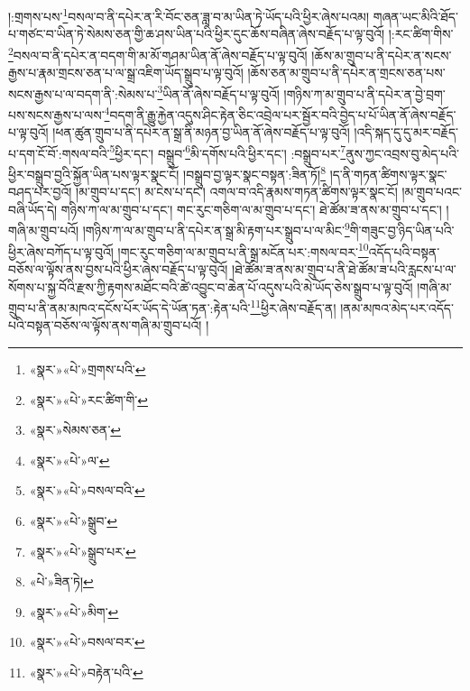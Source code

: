 །:གྲགས་པས་\footnote{«སྣར་»«པེ་»གྲགས་པའི་}བསལ་བ་ནི་དཔེར་ན་རི་བོང་ཅན་ཟླ་བ་མ་ཡིན་ཏེ་ཡོད་པའི་ཕྱིར་ཞེས་པའམ། གཞན་ཡང་མིའི་ཐོད་པ་གཙང་བ་ཡིན་ཏེ་སེམས་ཅན་གྱི་ཆ་ཤས་ཡིན་པའི་ཕྱིར་དུང་ཆོས་བཞིན་ཞེས་བརྗོད་པ་ལྟ་བུའོ། །:རང་ཚིག་གིས་\footnote{«སྣར་»«པེ་»རང་ཚིག་གི་}བསལ་བ་ནི་དཔེར་ན་བདག་གི་མ་མོ་གཤམ་ཡིན་ནོ་ཞེས་བརྗོད་པ་ལྟ་བུའོ། །ཆོས་མ་གྲུབ་པ་ནི་དཔེར་ན་སངས་རྒྱས་པ་རྣམ་གྲངས་ཅན་པ་ལ་སྒྲ་འཇིག་ཡོད་སྒྲུབ་པ་ལྟ་བུའོ། །ཆོས་ཅན་མ་གྲུབ་པ་ནི་དཔེར་ན་གྲངས་ཅན་པས་སངས་རྒྱས་པ་ལ་བདག་ནི་:སེམས་པ་\footnote{«སྣར་»སེམས་ཅན་}ཡིན་ནོ་ཞེས་བརྗོད་པ་ལྟ་བུའོ། །གཉིས་ཀ་མ་གྲུབ་པ་ནི་དཔེར་ན་བྱེ་བྲག་པས་སངས་རྒྱས་པ་ལས་\footnote{«སྣར་»«པེ་»ལ་}བདག་ནི་རྒྱུ་རྐྱེན་འདུས་ཤིང་རྟེན་ཅིང་འབྲེལ་པར་སྦྱོར་བའི་བྱེད་པ་པོ་ཡིན་ནོ་ཞེས་བརྗོད་པ་ལྟ་བུའོ། །ཕན་ཚུན་གྲུབ་པ་ནི་དཔེར་ན་སྒྲ་ནི་མཉན་བྱ་ཡིན་ནོ་ཞེས་བརྗོད་པ་ལྟ་བུའོ། །འདི་སྐད་དུ་དུ་མར་བརྗོད་པ་དག་ངོ་བོ་:གསལ་བའི་\footnote{«སྣར་»«པེ་»བསལ་བའི་}ཕྱིར་དང་། བསྒྲུབ་\footnote{«སྣར་»«པེ་»སྒྲུབ་}མི་དགོས་པའི་ཕྱིར་དང་། :བསྒྲུབ་པར་\footnote{«སྣར་»«པེ་»སྒྲུབ་པར་}ནུས་ཀྱང་འབྲས་བུ་མེད་པའི་ཕྱིར་བསྒྲུབ་བྱའི་སྐྱོན་ཡིན་པས་ལྟར་སྣང་ངོ། །བསྒྲུབ་བྱ་ལྟར་སྣང་བསྟན་:ཟིན་ཏོ།\footnote{«པེ་»ཟིན་ཏེ།} །ད་ནི་གཏན་ཚིགས་ལྟར་སྣང་བཤད་པར་བྱའོ། །མ་གྲུབ་པ་དང་། མ་ངེས་པ་དང་། འགལ་བ་འདི་རྣམས་གཏན་ཚིགས་ལྟར་སྣང་ངོ། །མ་གྲུབ་པའང་བཞི་ཡོད་དེ། གཉིས་ཀ་ལ་མ་གྲུབ་པ་དང་། གང་རུང་གཅིག་ལ་མ་གྲུབ་པ་དང་། ཐེ་ཚོམ་ཟ་ནས་མ་གྲུབ་པ་དང་། །གཞི་མ་གྲུབ་པའོ། །གཉིས་ཀ་ལ་མ་གྲུབ་པ་ནི་དཔེར་ན་སྒྲ་མི་རྟག་པར་སྒྲུབ་པ་ལ་མིང་\footnote{«སྣར་»«པེ་»མིག་}གི་གཟུང་བྱ་ཉིད་ཡིན་པའི་ཕྱིར་ཞེས་བཀོད་པ་ལྟ་བུའོ། །གང་རུང་གཅིག་ལ་མ་གྲུབ་པ་ནི་སྒྲ་མངོན་པར་:གསལ་བར་\footnote{«སྣར་»«པེ་»བསལ་བར་}འདོད་པའི་བསྟན་བཅོས་ལ་ལྟོས་ནས་བྱས་པའི་ཕྱིར་ཞེས་བརྗོད་པ་ལྟ་བུའོ། །ཐེ་ཚོམ་ཟ་ནས་མ་གྲུབ་པ་ནི་ཐེ་ཚོམ་ཟ་པའི་རླངས་པ་ལ་སོགས་པ་སྐྱ་བོའི་རྫས་ཀྱི་རྟགས་མཐོང་བའི་ཚེ་འབྱུང་བ་ཆེན་པོ་འདུས་པའི་མེ་ཡོད་ཅེས་སྒྲུབ་པ་ལྟ་བུའོ། །གཞི་མ་གྲུབ་པ་ནི་ནམ་མཁའ་དངོས་པོར་ཡོད་དེ་ཡོན་ཏན་:རྟེན་པའི་\footnote{«སྣར་»«པེ་»བརྟེན་པའི་}ཕྱིར་ཞེས་བརྗོད་ན། །ནམ་མཁའ་མེད་པར་འདོད་པའི་བསྟན་བཅོས་ལ་ལྟོས་ནས་གཞི་མ་གྲུབ་པའོ། །
